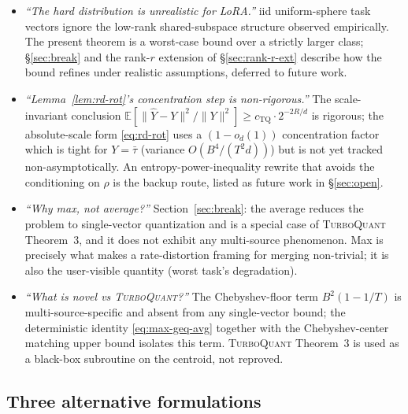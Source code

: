 \documentclass{article}
\theoremstyle{remark}
\newcommand{\E}{\mathbb{E}}
\begin{document}
\begin{itemize}
  \item \emph{``The hard distribution is unrealistic for LoRA.''} iid
  uniform-sphere task vectors ignore the low-rank shared-subspace
  structure observed empirically. The present theorem is a worst-case
  bound over a strictly larger class; \S\ref{sec:break} and the
  rank-$r$ extension of \S\ref{sec:rank-r-ext} describe how the bound
  refines under realistic assumptions, deferred to future work.
  \item \emph{``Lemma~\ref{lem:rd-rot}'s concentration step is
  non-rigorous.''} The scale-invariant conclusion $\E[\|\hat Y - Y\|^2
  /\|Y\|^2]\geq c_{\mathrm{TQ}}\cdot 2^{-2R/d}$ is rigorous; the
  absolute-scale form \eqref{eq:rd-rot} uses a $(1-o_d(1))$
  concentration factor which is tight for $Y = \bar\tau$ (variance
  $O(B^4/(T^2 d))$) but is not yet tracked non-asymptotically. An
  entropy-power-inequality rewrite that avoids the conditioning on
  $\rho$ is the backup route, listed as future work in \S\ref{sec:open}.
  \item \emph{``Why max, not average?''} Section~\ref{sec:break}: the
  average reduces the problem to single-vector quantization and is a
  special case of \textsc{TurboQuant} Theorem~3, and it does not
  exhibit any multi-source phenomenon. Max is precisely what makes
  a rate-distortion framing for merging non-trivial; it is also the
  user-visible quantity (worst task's degradation).
  \item \emph{``What is novel vs \textsc{TurboQuant}?''} The
  Chebyshev-floor term $B^2(1-1/T)$ is multi-source-specific and
  absent from any single-vector bound; the deterministic identity
  \eqref{eq:max-geq-avg} together with the Chebyshev-center matching
  upper bound isolates this term. \textsc{TurboQuant} Theorem~3 is
  used as a black-box subroutine on the centroid, not reproved.
\end{itemize}

\subsection{Three alternative formulations}\label{sec:failure-alt}
\end{document}
